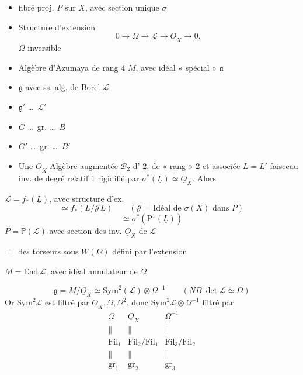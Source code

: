 \documentclass[11pt,a4paper]{article}
\begin{document}
\begin{itemize}
\item[a)] fibré \struck{\ill{}}  proj. $P$ sur $X$, avec section unique $\sigma$
\item[b)] Structure d'extension
\[
0 \to \Omega \to \mathcal{L} \to \underline{O}_X \to 0,
\]
$\Omega$ inversible
\item[c)] Algèbre d'Azumaya de rang 4 $M$, avec idéal  « spécial » \struck{\ill{}} $\mathfrak{a}$
\item[d)] $\mathfrak{g}$ avec ss.-alg. de Borel $\mathcal{L}$
\item[d')] $\mathfrak{g}'$ \ldots\ $\mathcal{L}'$
\item[e)] $G$ \ldots\ gr. \ldots\ $B$
\item[e')] $G'$ \ldots\ gr. \ldots\ $B'$ 
\item[f)] Une \struck{\ill{}} $\underline{O}_X$-Algèbre augmentée $\mathcal{B}_2$ \struck{\ill{}}  d' 2, de « rang » 2  et associée $\underline{L} = \underline{L}'$ faisceau inv. de degré relatif 1 rigidifié par $\sigma^*(\underline{L}) \simeq \underline{O}_X$. Alors
\end{itemize}

$\mathcal{L} = f_*(\underline{L})$, avec structure d'ex. 
\[
\simeq f_*(\underline{L}/\mathcal{J}\underline{L}) \qquad (\mathcal{J} = \text{Idéal de } \sigma(X) \text{ dans } P)
\]
\[
\simeq \sigma^*(\mathrm{P}^1(\underline{L}))
\]
$P = \mathbb{P}(\mathcal{L})$ avec section  des  inv. $\underline{O}_X$ de $\mathcal{L}$

$=$   \ill{} des torseurs sous $W(\Omega)$ défini par l'extension

$M = \underline{\mathrm{End}}\,\mathcal{L}$, avec idéal annulateur de $\Omega$

\[
\mathfrak{g} = M/\underline{O}_X \simeq \mathrm{Sym}^2(\mathcal{L})\otimes\Omega^{-1} \qquad (\textit{NB}\ \det\mathcal{L}\simeq\Omega)
\]
Or $\mathrm{Sym}^2\mathcal{L}$ est filtré par  $\underline{O}_X, \Omega, \Omega^2$, donc $\mathrm{Sym}^2\mathcal{L}\otimes\Omega^{-1}$ filtré par \uncertain{(\ldots)}
\[
\begin{array}{ccc}
\Omega & \underline{O}_X & \Omega^{-1}\\
\| & \| & \|\\
\mathrm{Fil}_1 & \mathrm{Fil}_2/\mathrm{Fil}_1 & \mathrm{Fil}_3/\mathrm{Fil}_2\\
\| & \| & \|\\
\mathrm{gr}_1 & \mathrm{gr}_2 & \mathrm{gr}_3
\end{array}
\]
\end{document}
